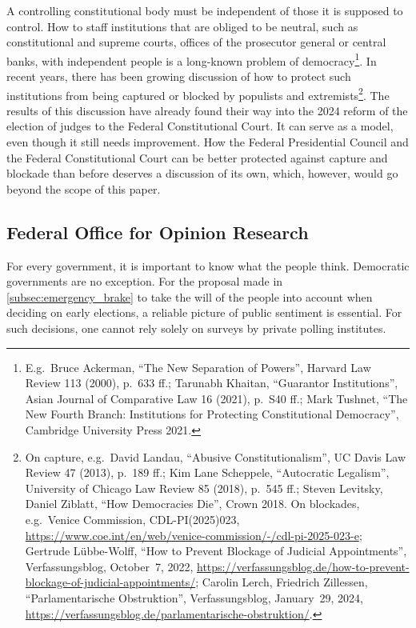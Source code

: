 A controlling constitutional body must be independent of those it is supposed to control.
How to staff institutions that are obliged to be neutral, such as constitutional and supreme courts, offices of the prosecutor general or central banks, with independent people is a long-known problem of democracy\footnote{E.g.\ Bruce Ackerman, \enquote{The New Separation of Powers}, Harvard Law Review 113 (2000), p.~633 ff.; Tarunabh Khaitan, \enquote{Guarantor Institutions}, Asian Journal of Comparative Law 16 (2021), p.~S40 ff.; Mark Tushnet, \enquote{The New Fourth Branch: Institutions for Protecting Constitutional Democracy}, Cambridge University Press 2021.}.
In recent years, there has been growing discussion of how to protect such institutions from being captured or blocked by populists and extremists\footnote{On capture, e.g.\ David Landau, \enquote{Abusive Constitutionalism}, UC Davis Law Review 47 (2013), p.~189 ff.; Kim Lane Scheppele, \enquote{Autocratic Legalism}, University of Chicago Law Review 85 (2018), p.~545 ff.; Steven Levitsky, Daniel Ziblatt, \enquote{How Democracies Die}, Crown 2018.
On blockades, e.g.\ Venice Commission, CDL-PI(2025)023, \url{https://www.coe.int/en/web/venice-commission/-/cdl-pi-2025-023-e}; Gertrude Lübbe-Wolff, \enquote{How to Prevent Blockage of Judicial Appointments}, Verfassungsblog, October~7, 2022, \url{https://verfassungsblog.de/how-to-prevent-blockage-of-judicial-appointments/}; Carolin Lerch, Friedrich Zillessen, \enquote{Parlamentarische Obstruktion}, Verfassungsblog, January~29, 2024, \url{https://verfassungsblog.de/parlamentarische-obstruktion/}.}.
The results of this discussion have already found their way into the 2024 reform of the election of judges to the Federal Constitutional Court.
It can serve as a model, even though it still needs improvement.
How the Federal Presidential Council and the Federal Constitutional Court can be better protected against capture and blockade than before deserves a discussion of its own, which, however, would go beyond the scope of this paper.

\subsection{Federal Office for Opinion Research}\label{subsec:opinion_research_office}

For every government, it is important to know what the people think.
Democratic governments are no exception.
For the proposal made in \cref{subsec:emergency_brake} to take the will of the people into account when deciding on early elections,
a reliable picture of public sentiment is essential.
For such decisions, one cannot rely solely on surveys by private polling institutes.

